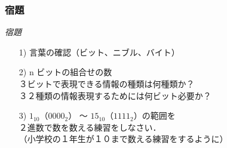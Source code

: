 \documentclass{beamer}                 %
\begin{document}
\begin{frame}
  \frametitle{宿題}

\emph{宿題}
\begin{enumerate}
\item[1)] 言葉の確認（ビット、ニブル、バイト）
\vfill
\item[2)] n ビットの組合せの数 \\
  ３ビットで表現できる情報の種類は何種類か？ \\
  ３２種類の情報表現するためには何ビット必要か？
\vfill
\item[3)] $1_{10}$（$0000_2$） 〜 $15_{10}$（$1111_2$）の範囲を \\
  ２進数で数を数える練習をしなさい．\\
  （小学校の１年生が１０まで数える練習をするように）
\vfill
\end{enumerate}
\end{frame}
\end{document}
